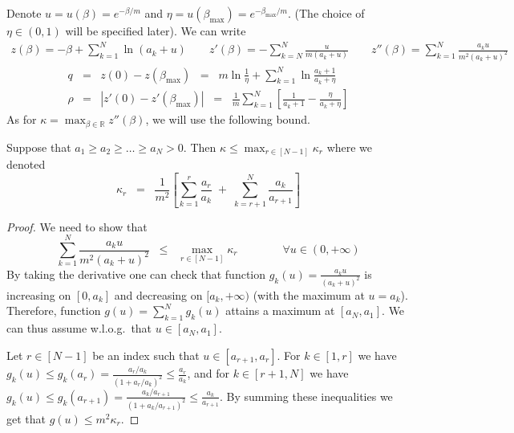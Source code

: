 \documentclass[final,12pt]{colt2018}
\def\bmax{{\beta_{\max}}}
\begin{document}
Denote $u=u(\beta)=e^{-\beta/m}$ and $\eta=u(\bmax)=e^{-\bmax/m}$. (The choice of $\eta\in(0,1)$ will be specified later).
We can write
\begin{eqnarray}
z(\beta)=-\beta+\sum_{k=1}^N \ln (a_k+u) \qquad
z'(\beta)=-\sum_{k=N}^N \frac{u}{m(a_k+u)} \qquad
z''(\beta)=\sum_{k=1}^N \frac{a_ku}{m^2(a_k+u)^2}
\end{eqnarray}
\begin{eqnarray}
q&=&z(0)-z(\bmax)\;\;=\;\;m\ln\frac{1}{\eta}+\sum_{k=1}^N \ln \frac{a_k+1}{a_k+\eta} \\
\rho&=&|z'(0)-z'(\bmax)|\;\;=\;\;\frac{1}{m}\sum_{k=1}^N \left[\frac{1}{a_k+1}-\frac{\eta}{a_k+\eta}\right] 
\end{eqnarray}
As for $\kappa=\max_{\beta\in\mathbb R}z''(\beta)$, we will use the following bound.
\renewcommand{\ell}{r}
\begin{lemma}
Suppose that $a_1\ge a_2\ge \ldots \ge a_N> 0$. Then $\kappa\le\max_{\ell\in[N-1]}\kappa_\ell$
where we denoted
$$
\kappa_{\ell}
\;\;=\;\; \frac{1}{m^2}\left[\sum_{k=1}^{\ell} \frac{a_{\ell}}{a_k}
         \;+\; \sum_{k=\ell+1}^N \frac{a_k}{a_{\ell+1}}\right]
$$
\end{lemma}
\begin{proof}
We need to show that 
$$
\sum_{k=1}^N \frac{a_ku}{m^2(a_k+u)^2} 
\;\;\le\;\;   \max_{\ell\in[N-1]}\kappa_{\ell}
\qquad\qquad\forall u\in(0,+\infty)
$$
By taking the derivative one can check that function $g_k(u)=\frac{a_ku}{(a_k+u)^2}$ is increasing on $[0,a_k]$ and decreasing on $[a_k,+\infty)$
(with the maximum at $u=a_k$). Therefore, function $g(u)=\sum_{k=1}^N g_k(u)$ attains a maximum at $[a_N,a_1]$. We can thus assume
w.l.o.g.\ that $u\in[a_N,a_1]$.



Let $\ell\in[N-1]$ be an index such that $u\in[a_{\ell+1},a_\ell]$. For $k\in[1,\ell]$ we have
$
g_k(u)\le g_k(a_\ell)=\frac{a_\ell/a_k}{(1+a_\ell/a_k)^2}\le \frac{a_\ell}{a_k}
$,
and for $k\in[\ell+1,N]$ we have
$
g_k(u)\le g_k(a_{\ell+1})=\frac{a_k/a_{\ell+1}}{(1+a_k/a_{\ell+1})^2}\le \frac{a_k}{a_{\ell+1}}
$. By summing these inequalities we get that $g(u)\le m^2\kappa_\ell$.
\end{proof}
\end{document}
